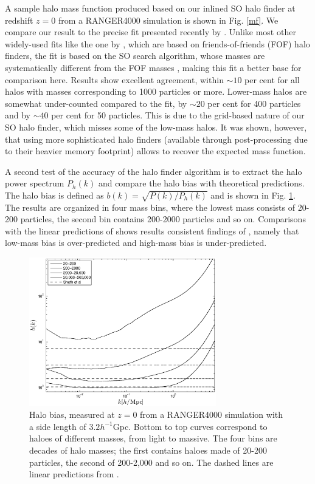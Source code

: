A sample halo mass function produced based on our inlined SO halo finder 
at redshift $z=0$ from a RANGER4000 simulation is shown in Fig. \ref{mf}. We compare our result to the 
precise fit presented recently by \citet{2008ApJ...688..709T}. Unlike most
other widely-used fits like the one by \citet{2002MNRAS.329...61S}, which are based on friends-of-friends (FOF)
halo finders, the \citet{2008ApJ...688..709T} fit is based on the
SO search algorithm, whose masses are systematically different 
from the FOF masses \citep[e.g.][]{2007MNRAS.374....2R,2008ApJ...688..709T}, 
making this fit a better base for comparison here. Results show excellent
agreement, within $\sim10$ per cent for all halos with masses corresponding to
1000 particles or more. Lower-mass halos are somewhat under-counted compared
to the \citet{2008ApJ...688..709T} fit, by $\sim20$ per cent for 400 particles and 
by $\sim40$ per cent for 50 particles. This is due to the grid-based nature of our
SO halo finder, which misses some of the low-mass halos. It was shown, however, that using more sophisticated
halo finders (available through post-processing due to their heavier memory
footprint) allows to recover the expected mass function.

A second test of the accuracy of the halo finder algorithm is to extract the halo power spectrum $P_{h}(k)$ and compare the halo bias
with theoretical predictions. The halo bias is defined as $b(k) = \sqrt{P(k)/P_{h}(k)}$ and is shown in Fig. \ref{fig:halo}.
The results are organized in four mass bins, where the lowest mass consists of 20-200 particles, the second bin 
contains 200-2000 particles and so on. Comparisons with the linear predictions of \cite{Sheth_et_al} shows
results consistent findings of \cite{Thinker}, namely that low-mass bias is over-predicted and high-mass bias is under-predicted.

\begin{figure}%
  \begin{center}
    \includegraphics[width=3.2in]{graphs/bias.eps}
  \end{center}
  \caption{Halo bias, measured at $z=0$ from a RANGER4000 simulation with a side length of $3.2 h^{-1}$Gpc.
  Bottom to top curves correspond to haloes of different masses, from light to massive. The four bins are decades
  of halo masses; the first contains haloes made of 20-200 particles, the second of 200-2,000 and so on.
  The dashed lines are linear predictions from \protect \cite{Sheth_et_al}.
    \label{fig:halo}}
\end{figure}


